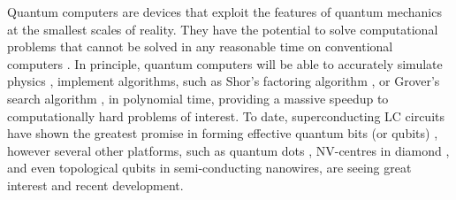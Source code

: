 
Quantum computers are devices that exploit the features of quantum mechanics at
the smallest scales of reality. They have the potential to solve computational
problems that cannot be solved in any reasonable time on conventional computers
\cite{fowler12_surfac_codes}. In principle, quantum computers will be able to
accurately simulate physics \cite{feynman82_simul_physic_with_comput}, implement
algorithms, such as Shor's factoring algorithm \cite{Shor_1997}, or Grover's
search algorithm \cite{Grover_1996}, in polynomial time, providing a massive
speedup to computationally hard problems of interest. To date, superconducting
LC circuits have shown the greatest promise in forming effective quantum bits
(or qubits) \cite{Rol_2019} \cite{barends14_super_quant_circuit_at_surfac},
however several other platforms, such as quantum dots
\cite{huang19_fidel_bench_two_qubit_gates_silic} \cite{Lawrie_2020}, NV-centres
in diamond \cite{}, and even topological qubits in semi-conducting nanowires,
are seeing great interest and recent development.


